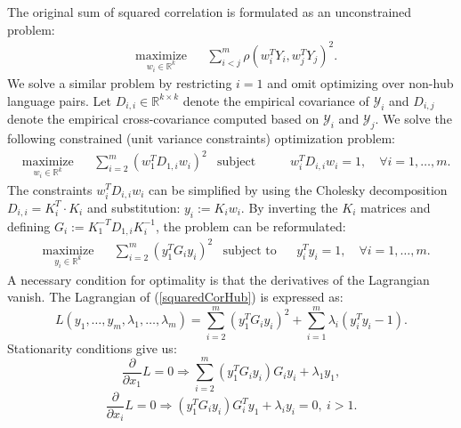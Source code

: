 \documentclass[twoside,11pt]{article}
\newcommand{\RR}{\mathbb{R}}
\begin{document}
The original sum of squared correlation is formulated as an unconstrained problem:
\begin{equation*}
  \begin{aligned}
    & \underset{w_i \in \RR^{k}}{\text{maximize}}
    & & \sum_{i < j}^m  \rho(w_i^T Y_i, w_j^T Y_j)^2.
\end{aligned}
\end{equation*}
We solve a similar problem by restricting $i=1$ and omit optimizing over non-hub language pairs.
Let $D_{i,i} \in \RR^{k \times k}$ denote the empirical covariance of $\mathcal{Y}_i$ and $D_{i,j}$ denote the empirical cross-covariance computed based on $\mathcal{Y}_i$ and $\mathcal{Y}_j$. We solve the following constrained (unit variance constraints) optimization problem:
\begin{equation}\label{squaredCorHubOriginal}
  \begin{aligned}
    & \underset{w_i \in \RR^{k}}{\text{maximize}}
    & & \sum_{i = 2}^m  \left(w_1^T D_{1,i} w_i \right)^2
    & \text{subject to}
    & & w_i^T D_{i,i} w_i = 1, \quad\forall i = 1,\ldots, m.
\end{aligned}
\end{equation}
The constraints $w_i^T D_{i,i} w_i$ can be simplified by using the Cholesky decomposition $D_{i,i} = K_i^T \cdot K_i$ and substitution: $y_i := K_i w_i$. By inverting the $K_i$ matrices and defining  $G_i := K_1^{-T} D_{1,i} K_i^{-1}$, the problem can be reformulated:
\begin{equation}\label{squaredCorHub}
  \begin{aligned}
    & \underset{y_i \in \RR^{k}}{\text{maximize}}
    & & \sum_{i = 2}^m  \left(y_1^T G_{i} y_i \right)^2
    & \text{subject to}
    & & y_i^T y_i = 1, \quad\forall i = 1,\ldots, m.
\end{aligned}
\end{equation}
A necessary condition for optimality is that the derivatives of the Lagrangian vanish. The Lagrangian of (\ref{squaredCorHub}) is expressed as:
$$  L(y_1, \ldots, y_m, \lambda_1, \ldots, \lambda_m) = \sum_{i = 2}^m  \left(y_1^T G_{i} y_i \right)^2 + \sum_{i=1}^m \lambda_i \left(y_i^T y_i - 1\right).$$
Stationarity conditions give us:
\begin{equation}\label{dLdx1}
 \frac{\partial}{\partial x_1} L = 0 \Rightarrow \sum_{i = 2}^m  \left(y_1^T G_{i} y_i \right) G_i y_i + \lambda_1 y_1,
\end{equation}
\begin{equation}\label{dLdxi}
\frac{\partial}{\partial x_i} L = 0 \Rightarrow \left(y_1^T G_{i} y_i \right) G_{i}^T y_1 + \lambda_i y_i = 0,~i > 1.
\end{equation}
\end{document}
